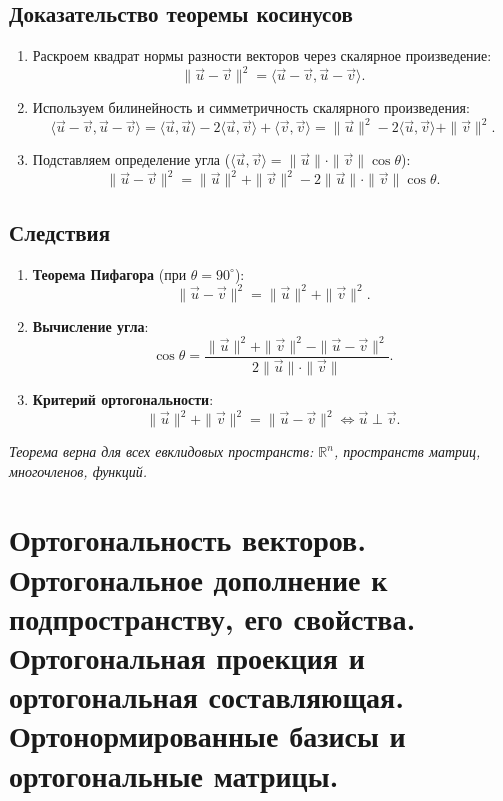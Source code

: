 \documentclass[12pt]{article}
\begin{document}
\subsection*{Доказательство теоремы косинусов}
\begin{enumerate}
    \item Раскроем квадрат нормы разности векторов через скалярное произведение:
    $$
    \|\vec{u} - \vec{v}\|^2 = \langle \vec{u} - \vec{v}, \vec{u} - \vec{v} \rangle.
    $$
    \item Используем билинейность и симметричность скалярного произведения:
    $$
    \langle \vec{u} - \vec{v}, \vec{u} - \vec{v} \rangle = \langle \vec{u}, \vec{u} \rangle - 2\langle \vec{u}, \vec{v} \rangle + \langle \vec{v}, \vec{v} \rangle = \|\vec{u}\|^2 - 2\langle \vec{u}, \vec{v} \rangle + \|\vec{v}\|^2.
    $$
    \item Подставляем определение угла ($\langle \vec{u}, \vec{v} \rangle = \|\vec{u}\| \cdot \|\vec{v}\| \cos \theta$):
    $$
    \|\vec{u} - \vec{v}\|^2 = \|\vec{u}\|^2 + \|\vec{v}\|^2 - 2\|\vec{u}\| \cdot \|\vec{v}\| \cos \theta.
    $$
\end{enumerate}


\subsection*{Следствия}
\begin{enumerate}
    \item \textbf{Теорема Пифагора} (при $\theta = 90^\circ$):
    $$
    \|\vec{u} - \vec{v}\|^2 = \|\vec{u}\|^2 + \|\vec{v}\|^2.
    $$
    \item \textbf{Вычисление угла}:
    $$
    \cos \theta = \frac{\|\vec{u}\|^2 + \|\vec{v}\|^2 - \|\vec{u} - \vec{v}\|^2}{2\|\vec{u}\| \cdot \|\vec{v}\|}.
    $$
    \item \textbf{Критерий ортогональности}:
    $$
    \|\vec{u}\|^2 + \|\vec{v}\|^2 = \|\vec{u} - \vec{v}\|^2 \iff \vec{u} \perp \vec{v}.
    $$
\end{enumerate}

\textit{Теорема верна для всех евклидовых пространств: $\mathbb{R}^n$, пространств матриц, многочленов, функций.}

\section{Ортогональность векторов. Ортогональное дополнение к подпространству, его свойства. Ортогональная проекция и ортогональная составляющая. Ортонормированные базисы и ортогональные матрицы.}
\end{document}
